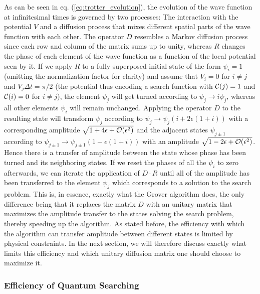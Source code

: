 As can be seen in eq. (\ref{eq:trotter_evolution}), the evolution of the wave function at infinitesimal times is governed by two processes: The interaction with the potential $V$ and a diffusion process that mixes different spatial parts of the wave function with each other. The operator $D$ resembles a Markov diffusion process since each row and column of the matrix sums up to unity, whereas $R$ changes the phase of each element of the wave function as a function of the local potential seen by it. If we apply $R$ to a fully superposed initial state of the form $\psi_i = 1$ (omitting the normalization factor for clarity) and assume that $V_i = 0$ for $i \ne j$ and $V_j \Delta t = \pi/2$ (the potential thus encoding a search function with $\Or(j)=1$ and $\Or(i)=0$ for $i\ne j$), the element $\psi_j$ will get turned according to $\psi_j \to i\psi_j $, whereas all other elements $\psi_i$ will remain unchanged. Applying the operator $D$ to the resulting state will transform $\psi_j$ according to $\psi_j \to \psi_j(i+2\epsilon(1+i))$ with a corresponding amplitude $\sqrt{1+4\epsilon+\begin{mathcal}O\end{mathcal}(\epsilon^2)}$ and the adjacent states $\psi_{j\pm 1}$ according to $\psi_{j\pm 1} \to \psi_{j\pm 1}(1-\epsilon(1+i))$ with an amplitude $\sqrt{1-2\epsilon +\begin{mathcal}O\end{mathcal}(\epsilon^2)}$. Hence there is a transfer of amplitude between the state whose phase has been turned and its neighboring states. If we reset the phases of all the $\psi_i$ to zero afterwards, we can iterate the application of $D\cdot R$ until all of the amplitude has been transferred to the element $\psi_j$ which corresponds to a solution to the search problem. This is, in essence, exactly what the Grover algorithm does, the only difference being that it replaces the matrix $D$ with an unitary matrix that maximizes the amplitude transfer to the states solving the search problem, thereby speeding up the algorithm. As stated before, the efficiency with which the algorithm can transfer amplitude between different states is limited by physical constraints. In the next section, we will therefore discuss exactly what limits this efficiency and which unitary diffusion matrix one should choose to maximize it.

\subsubsection{Efficiency of Quantum Searching}

